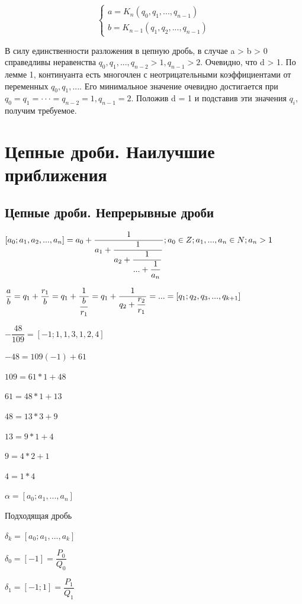 \documentclass[12pt]{article}
\begin{document}
\begin{equation}
    \begin{cases}
        a = K_{n}(q_0,q_1,...,q_{n-1})
        \\
        b = K_{n-1}(q_1,q_2,...,q_{n-1})
    \end{cases}
\end{equation}

В силу единственности разложения в цепную дробь, в
случае a > b > 0 справедливы неравенства $q_0,q_1,...,q_{n-2} > 1, q_{n−1} > 2$.
Очевидно, что d > 1. По лемме 1, континуанта есть многочлен с неотрицательными коэффициентами от переменных $q_0,q_1,...$. Его минимальное
значение очевидно достигается при $q_0 = q_1 = · · · = q_{n−2} = 1, q_{n−1} = 2$. Положив d = 1 и подставив эти значения $q_i$, получим требуемое.

\section{Цепные дроби. Наилучшие приближения}

\subsection{Цепные дроби. Непрерывные дроби}

$[a_0;a_1,a_2,...,a_n] = a_0 + \dfrac{1}{a_1 + \dfrac{1}{a_2 + \dfrac{1}{... + \dfrac{1}{a_n}}}}; a_0 \in Z; a_1,...,a_n \in N; a_n > 1
    \vspace{1 ex}$

$\dfrac{a}{b} = q_1 + \dfrac{r_1}{b} = q_1 + \dfrac{1}{\dfrac{b}{r_1}} = q_1 + \dfrac{1}{q_2 + \dfrac{r_2}{r_1}} = ... = [q_1;q_2,q_3,...,q_{k+1}] \vspace{2 ex}$

$-\dfrac{48}{109} = [-1;1,1,3,1,2,4] $

$-48 = 109(-1) + 61$

$109 = 61*1 +48$

$61 = 48*1 + 13$

$48 = 13*3 + 9$

$13 = 9*1 + 4$

$9 = 4*2+1$

$4=1*4$

$\alpha = [a_0;a_1,...,a_n]$

Подходящая дробь

$\delta_k = [a_0;a_1,...,a_k]$

$\delta_0 = [-1] = \dfrac{P_0}{Q_0}$

$\delta_1 = [-1;1] = \dfrac{P_1}{Q_1}$
\end{document}
